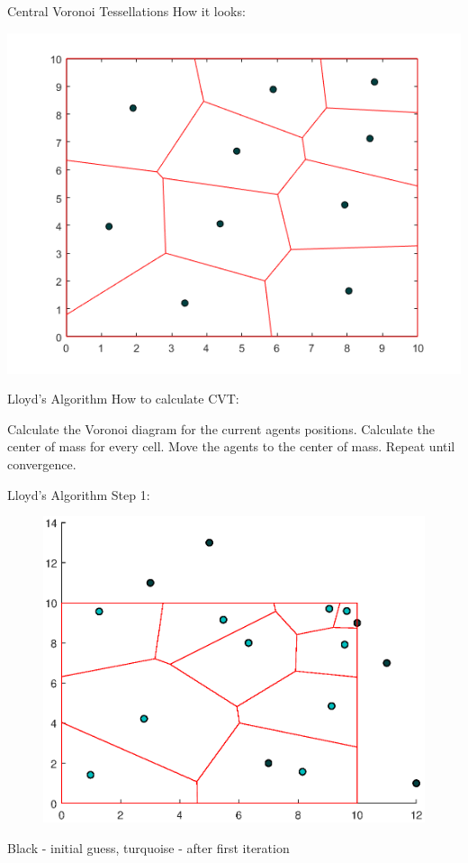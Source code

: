 \documentclass[t]{beamer}
\begin{document}
\begin{frame}[label=centvorpart3]{Central Voronoi Tessellations}
How it looks:
\begin{center}
\includegraphics[scale=0.5]{background/central-Voronoi-example.png}
\end{center}
\end{frame}
\begin{frame}[label=lloydsalg1]{Lloyd's Algorithm}
How to calculate CVT:
\begin{algorithm}[H]
\caption{Lloyd's Algorithm} \label{LloydAlgo}
\begin{algorithmic}[1]
\State Calculate the Voronoi diagram for the current agents positions.
\State Calculate the center of mass for every cell.
\State Move the agents to the center of mass.
\State Repeat until convergence.
\end{algorithmic}
\end{algorithm}
\end{frame}
\begin{frame}[label=lloydsalg2]{Lloyd's Algorithm}
Step 1:
\begin{figure}
\centering
\includegraphics[scale=0.5]{background/cvt-calc-step1.eps}
\end{figure}
Black - initial guess, turquoise - after first iteration
\end{frame}
\end{document}
